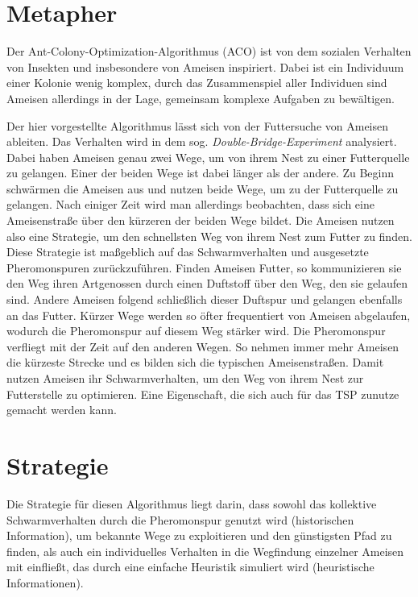 
\section{Metapher}

Der Ant-Colony-Optimization-Algorithmus (ACO) ist von dem sozialen Verhalten
von Insekten und insbesondere von Ameisen inspiriert. Dabei ist ein
Individuum einer Kolonie wenig komplex, durch das Zusammenspiel aller
Individuen sind Ameisen allerdings in der Lage, gemeinsam komplexe Aufgaben
zu bewältigen.

Der hier vorgestellte Algorithmus lässt sich von der Futtersuche von Ameisen
ableiten. Das Verhalten wird in dem sog. \emph{Double-Bridge-Experiment}
analysiert. Dabei haben Ameisen genau zwei Wege, um von ihrem Nest zu einer
Futterquelle zu gelangen. Einer der beiden Wege ist dabei länger als der
andere. Zu Beginn schwärmen die Ameisen aus und nutzen beide Wege, um zu
der Futterquelle zu gelangen. Nach einiger Zeit wird man allerdings
beobachten, dass sich eine Ameisenstraße über den kürzeren der beiden Wege
bildet. Die Ameisen nutzen also eine Strategie, um den schnellsten Weg von
ihrem Nest zum Futter zu finden.
Diese Strategie ist maßgeblich auf das Schwarmverhalten und ausgesetzte
Pheromonspuren zurückzuführen. Finden Ameisen Futter, so kommunizieren sie
den Weg ihren Artgenossen durch einen Duftstoff über den Weg, den sie
gelaufen sind. Andere Ameisen folgend schließlich dieser Duftspur und
gelangen ebenfalls an das Futter. Kürzer Wege werden so öfter frequentiert
von Ameisen abgelaufen, wodurch die Pheromonspur auf diesem Weg stärker wird.
Die Pheromonspur verfliegt mit der Zeit auf den anderen Wegen.
So nehmen immer mehr Ameisen die kürzeste Strecke und es bilden sich 
die typischen Ameisenstraßen.
Damit nutzen Ameisen ihr Schwarmverhalten, um den Weg von ihrem Nest zur
Futterstelle zu optimieren. Eine Eigenschaft, die sich auch für das TSP
zunutze gemacht werden kann.

\section{Strategie}

Die Strategie für diesen Algorithmus liegt darin, dass sowohl das kollektive
Schwarmverhalten durch die Pheromonspur genutzt wird (historischen Information),
um bekannte Wege zu exploitieren und den günstigsten Pfad zu finden, als auch
ein individuelles Verhalten in die Wegfindung einzelner Ameisen mit einfließt,
das durch eine einfache Heuristik simuliert wird (heuristische Informationen).


